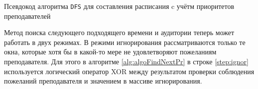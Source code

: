 \begin{algorithm} 
	\nonl{}
	\caption{Псевдокод алгоритма \texttt{DFS} для составления расписания c учётм приоритетов преподавателей}\label{alg:algoFindSolPr}
\end{algorithm} 

Метод поиска следующего подходящего времени и аудитории теперь может работать в двух режимах. В режими игнорирования рассматриваются только те окна, которые хотя бы в какой-то мере не удовлетворяют пожеланиям преподавателя. Для этого в алгоритме \ref{alg:algoFindNextPr} в строке \ref{step:ignor} используется логический оператор XOR между результатом проверки соблюдения пожеланий преподавателя и значением в массиве игнорирования.

